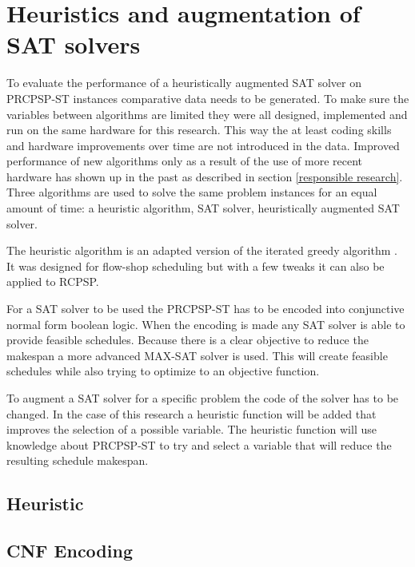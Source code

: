 \section{Heuristics and augmentation of SAT solvers}
To evaluate the performance of a heuristically augmented SAT solver on PRCPSP-ST instances comparative data needs to be generated.  To make sure the variables between algorithms are limited they were all designed, implemented and run on the same hardware for this research. This way the at least coding skills and hardware improvements over time are not introduced in the data. Improved performance of new algorithms only as a result of the use of more recent hardware has shown up in the past as described in section \ref{responsible research}. Three algorithms are used to solve the same problem instances for an equal amount of time: a heuristic algorithm, SAT solver, heuristically augmented SAT solver.

The heuristic algorithm is an adapted version of the iterated greedy algorithm \cite{RN32}. It was designed for flow-shop scheduling but with a few tweaks it can also be applied to RCPSP.

For a SAT solver to be used the PRCPSP-ST has to be encoded into conjunctive normal form boolean logic. When the encoding is made any SAT solver is able to provide feasible schedules. Because there is a clear objective to reduce the makespan a more advanced MAX-SAT solver is used. This will create feasible schedules while also trying to optimize to an objective function.

To augment a SAT solver for a specific problem the code of the solver has to be changed. In the case of this research a heuristic function will be added that improves the selection of a possible variable. The heuristic function will use knowledge about PRCPSP-ST to try and select a variable that will reduce the resulting schedule makespan.

\subsection{Heuristic}

\subsection{CNF Encoding}



